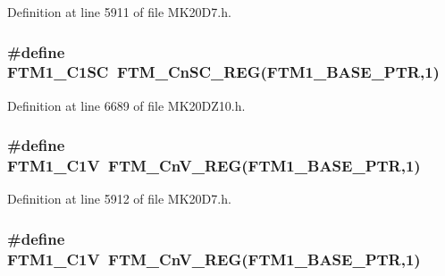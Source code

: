 Definition at line 5911 of file M\+K20\+D7.\+h.

\subsubsection[{\texorpdfstring{F\+T\+M1\+\_\+\+C1\+SC}{FTM1_C1SC}}]{\setlength{\rightskip}{0pt plus 5cm}\#define F\+T\+M1\+\_\+\+C1\+SC~{\bf F\+T\+M\+\_\+\+Cn\+S\+C\+\_\+\+R\+EG}({\bf F\+T\+M1\+\_\+\+B\+A\+S\+E\+\_\+\+P\+TR},1)}\hypertarget{group___f_t_m___register___accessor___macros_ga276fd16304067a9c337b2e116f9d692b}{}\label{group___f_t_m___register___accessor___macros_ga276fd16304067a9c337b2e116f9d692b}


Definition at line 6689 of file M\+K20\+D\+Z10.\+h.

\subsubsection[{\texorpdfstring{F\+T\+M1\+\_\+\+C1V}{FTM1_C1V}}]{\setlength{\rightskip}{0pt plus 5cm}\#define F\+T\+M1\+\_\+\+C1V~{\bf F\+T\+M\+\_\+\+Cn\+V\+\_\+\+R\+EG}({\bf F\+T\+M1\+\_\+\+B\+A\+S\+E\+\_\+\+P\+TR},1)}\hypertarget{group___f_t_m___register___accessor___macros_ga5597e3dd7e35757bd46aaf27dd62792c}{}\label{group___f_t_m___register___accessor___macros_ga5597e3dd7e35757bd46aaf27dd62792c}


Definition at line 5912 of file M\+K20\+D7.\+h.

\subsubsection[{\texorpdfstring{F\+T\+M1\+\_\+\+C1V}{FTM1_C1V}}]{\setlength{\rightskip}{0pt plus 5cm}\#define F\+T\+M1\+\_\+\+C1V~{\bf F\+T\+M\+\_\+\+Cn\+V\+\_\+\+R\+EG}({\bf F\+T\+M1\+\_\+\+B\+A\+S\+E\+\_\+\+P\+TR},1)}\hypertarget{group___f_t_m___register___accessor___macros_ga5597e3dd7e35757bd46aaf27dd62792c}{}\label{group___f_t_m___register___accessor___macros_ga5597e3dd7e35757bd46aaf27dd62792c}


